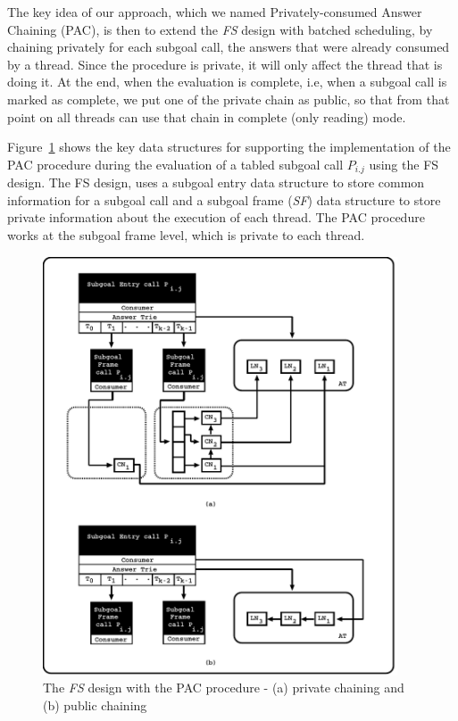 \documentclass{llncs}
\begin{document}
The key idea of our approach, which we named Privately-consumed Answer
Chaining (PAC), is then to extend the \emph{FS} design with batched
scheduling, by chaining privately for each subgoal call, the answers
that were already consumed by a thread. Since the procedure is
private, it will only affect the thread that is doing it. At the end,
when the evaluation is complete, i.e, when a subgoal call is marked as
complete, we put one of the private chain as public, so that from that
point on all threads can use that chain in complete (only reading)
mode.

Figure~\ref{fig_tabtries_pcc} shows the key data structures for
supporting the implementation of the PAC procedure during the
evaluation of a tabled subgoal call $P_{i.j}$ using the FS design. The
FS design, uses a subgoal entry data structure to store common
information for a subgoal call and a subgoal frame (\emph{SF}) data
structure to store private information about the execution of each
thread. The PAC procedure works at the subgoal frame level, which is
private to each thread. 

\begin{figure}[!ht]
\centering
\includegraphics[width=10.5cm]{figures/pcc.pdf}
\caption{The \emph{FS} design with the PAC procedure - (a) private
  chaining and (b) public chaining}
\label{fig_tabtries_pcc}
\end{figure}
\end{document}
